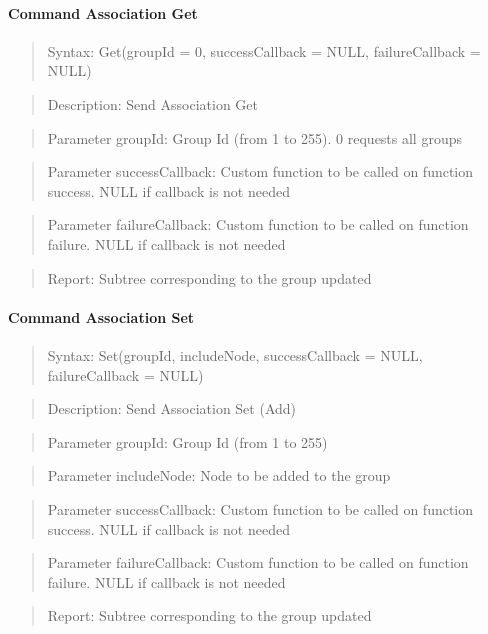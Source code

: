 \paragraph{Command Association Get}
\begin{quote}Syntax: Get(groupId = 0, successCallback = NULL, failureCallback = NULL)\end{quote}
\begin{quote}Description: Send Association Get\end{quote}
\begin{quote}Parameter groupId: Group Id (from 1 to 255). 0 requests all groups\end{quote}
\begin{quote}Parameter successCallback: Custom function to be called on function success. NULL if callback is not needed\end{quote}
\begin{quote}Parameter failureCallback: Custom function to be called on function failure. NULL if callback is not needed\end{quote}
\begin{quote}Report: Subtree corresponding to the group updated\end{quote}

\paragraph{Command Association Set}
\begin{quote}Syntax: Set(groupId, includeNode, successCallback = NULL, failureCallback = NULL)\end{quote}
\begin{quote}Description: Send Association Set (Add)\end{quote}
\begin{quote}Parameter groupId: Group Id (from 1 to 255)\end{quote}
\begin{quote}Parameter includeNode: Node to be added to the group\end{quote}
\begin{quote}Parameter successCallback: Custom function to be called on function success. NULL if callback is not needed\end{quote}
\begin{quote}Parameter failureCallback: Custom function to be called on function failure. NULL if callback is not needed\end{quote}
\begin{quote}Report: Subtree corresponding to the group updated\end{quote}

